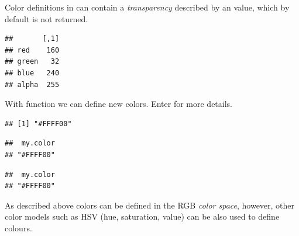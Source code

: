 \documentclass[krantz2]{krantz}\usepackage{knitr}%
\begin{document}
Color definitions in \Rlang can contain a \emph{transparency} described by an  value, which by default is not returned.

\begin{knitrout}\footnotesize
{}\color{fgcolor}\begin{kframe}
\begin{alltt}
\hlstd{(}\hlstd{,}  \hlstd{=} \hlstd{)}
\end{alltt}
\begin{verbatim}
##       [,1]
## red    160
## green   32
## blue   240
## alpha  255
\end{verbatim}
\end{kframe}
\end{knitrout}

With function  we can define new colors. Enter  for more details.

\begin{knitrout}\footnotesize
{}\color{fgcolor}\begin{kframe}
\begin{alltt}
\hlstd{(}\hlstd{,} \hlstd{,} \hlstd{)}
\end{alltt}
\begin{verbatim}
## [1] "#FFFF00"
\end{verbatim}
\begin{alltt}
\hlstd{(}\hlstd{,} \hlstd{,} \hlstd{,}  \hlstd{=} \hlstd{)}
\end{alltt}
\begin{verbatim}
##  my.color 
## "#FFFF00"
\end{verbatim}
\begin{alltt}
\hlstd{(}\hlstd{,} \hlstd{,} \hlstd{,}  \hlstd{=} \hlstd{,}  \hlstd{=} \hlstd{)}
\end{alltt}
\begin{verbatim}
##  my.color 
## "#FFFF00"
\end{verbatim}
\end{kframe}
\end{knitrout}

As described above colors can be defined in the RGB \emph{color space}, however, other color models such as HSV (hue, saturation, value) can be also used to define colours.
\end{document}
